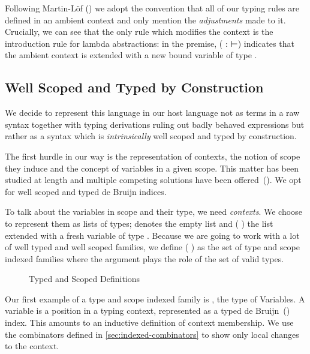 \begin{convention}
Following Martin-Löf (\citeyear{martin1982constructive}) we adopt the
convention that all of our typing rules are defined in an ambient
context  and only mention the \emph{adjustments} made to it.
Crucially, we can see that the only rule which modifies the context
is the introduction rule for lambda abstractions: in the premise,
{( :  ⊢)} indicates that the ambient context is extended
with a new bound variable  of type .
\end{convention}

\subsection{Well Scoped and Typed by Construction}

We decide to represent this language in our host language not as terms in
a raw syntax together with typing derivations ruling out badly behaved
expressions but rather as a syntax which is \emph{intrinsically} well scoped
and typed by construction.

The first hurdle in our way is the representation of contexts, the notion
of scope they induce and the concept of variables in a given scope. This
matter has been studied at length and multiple competing solutions have been
offered~(\cite{DBLP:conf/tphol/AydemirBFFPSVWWZ05}). We opt for well scoped
and typed de Bruijn indices.

To talk about the variables in scope and their type, we need \emph{contexts}. We
choose to represent them as lists of types; \AIC{[]} denotes the empty list and
(  ) the list  extended with a fresh variable of type .
Because we are going to work with a lot of well typed and well scoped families,
we define ( ) as the set of type and scope indexed families
where the argument  plays the role of the set of valid types.

\begin{figure}[h]
\caption{Typed and Scoped Definitions\label{fig:scoped}}
\end{figure}

Our first example of a type and scope indexed family is , the type of Variables.
A variable is a position in a typing context, represented as a typed
de Bruijn~(\citeyear{de1972lambda}) index. This amounts to an inductive definition of
context membership. We use the combinators defined in \cref{sec:indexed-combinators}
to show only local changes to the context.

